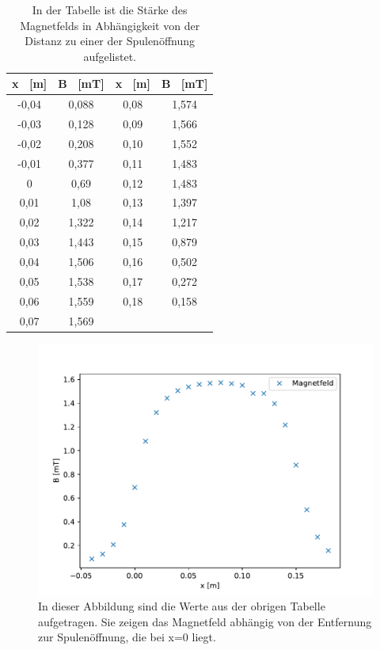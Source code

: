 \documentclass[titlepage = firstcover]{scrartcl}
\begin{document}
            \begin{table}[h]
                \centering 
                \caption{In der Tabelle ist die Stärke des Magnetfelds in Abhängigkeit von der Distanz zu einer der Spulenöffnung aufgelistet.}
                \label{tab:Spulelang}

                \begin{tabular}{c c c c}
                    \toprule
                    {x \ [m]} & {B \ [mT]} & {x \ [m]} & {B \ [mT]} \\
                    \midrule
                    -0,04 & 0,088  &  0,08   & 1,574 \\
                    -0,03 & 0,128  &  0,09   & 1,566 \\
                    -0,02 & 0,208  &  0,10   & 1,552 \\
                    -0,01 & 0,377  &  0,11   & 1,483 \\
                    0     & 0,69   &  0,12   & 1,483 \\
                    0,01  & 1,08   &  0,13   & 1,397 \\
                    0,02  & 1,322  &  0,14   & 1,217 \\
                    0,03  & 1,443  &  0,15   & 0,879 \\
                    0,04  & 1,506  &  0,16   & 0,502 \\
                    0,05  & 1,538  &  0,17   & 0,272 \\
                    0,06  & 1,559  &  0,18   & 0,158 \\
                    0,07  & 1,569  &         & \\
                    \bottomrule
                \end{tabular}                
            \end{table}

            \begin{figure}[h]
                \centering
                \includegraphics{Spulelang.pdf}
                \caption{In dieser Abbildung sind die Werte aus der obrigen Tabelle aufgetragen. Sie zeigen das Magnetfeld abhängig von der Entfernung zur Spulenöffnung, die bei x=0 liegt.}
                \label{fig:Spulelang}

            \end{figure}
\end{document}
